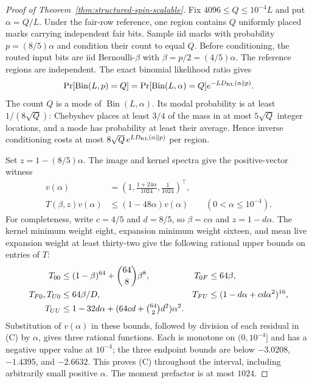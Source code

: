\begin{proof}[Proof of Theorem~\ref{thm:structured-spin-scalable}]
Fix $4096\le Q\le10^{-4}L$ and put $\alpha=Q/L$.
Under the fair-row reference, one region contains $Q$ uniformly placed
marks carrying independent fair bits. Sample iid marks with probability
$p=(8/5)\alpha$ and condition their count to equal $Q$. Before
conditioning, the routed input bits are iid Bernoulli-$\beta$ with
$\beta=p/2=(4/5)\alpha$. The reference regions are independent.
The exact binomial likelihood ratio gives
\[
 \Pr[\operatorname{Bin}(L,p)=Q]
 =\Pr[\operatorname{Bin}(L,\alpha)=Q]
   e^{-LD_{\rm KL}(\alpha\Vert p)}.
\]
The count $Q$ is a mode of $\operatorname{Bin}(L,\alpha)$. Its modal
probability is at least $1/(8\sqrt Q)$: Chebyshev places at least
$3/4$ of the mass in at most $5\sqrt Q$ integer locations, and a
mode has probability at least their average. Hence inverse
conditioning costs at most
$8\sqrt Q\,e^{LD_{\rm KL}(\alpha\Vert p)}$ per region.

Set $z=1-(8/5)\alpha$. The image and kernel spectra give the
positive-vector witness
\[
 \begin{aligned}
 v(\alpha)&=\left(1,\frac{1+24\alpha}{1024},
                       \frac1{1024}\right)^\top,\\
 T(\beta,z)v(\alpha)&\le(1-48\alpha)v(\alpha)
 \qquad(0<\alpha\le10^{-4}).
 \end{aligned}
 \tag{C}
\]
For completeness, write $c=4/5$ and $d=8/5$, so $\beta=c\alpha$
and $z=1-d\alpha$. The kernel minimum weight eight, expansion minimum
weight sixteen, and mean live expansion weight at least thirty-two
give the following rational upper bounds on entries of $T$:
\[
\begin{aligned}
 T_{00}&\le(1-\beta)^{64}+\binom{64}{8}\beta^8,&
 T_{0F}&\le64\beta,\\
 T_{F0},T_{U0}&\le64\beta/D,&
 T_{FU}&\le(1-d\alpha+cd\alpha^2)^{16},\\
 T_{UU}&\le1-32d\alpha+
       (64cd+\tbinom{64}{2}d^2)\alpha^2.
\end{aligned}
\]
Substitution of $v(\alpha)$ in these bounds, followed by division
of each residual in (C) by $\alpha$, gives three rational functions.
Each is monotone on $(0,10^{-4}]$ and has a negative upper value at
$10^{-4}$; the three endpoint bounds are below $-3.0208$,
$-1.4395$, and $-2.6632$. This proves (C) throughout the interval,
including arbitrarily small positive $\alpha$. The moment prefactor
is at most $1024$.


\end{proof}

